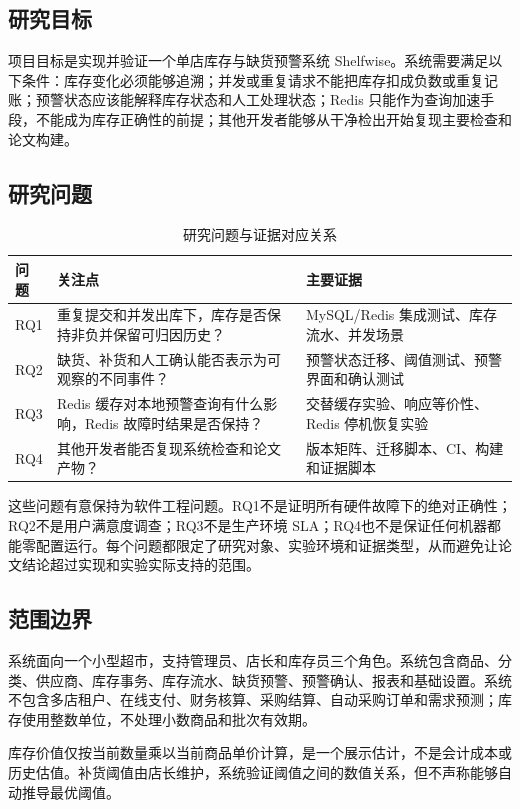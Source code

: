 \documentclass[UTF8,a4paper,11pt]{ctexart}
\begin{document}
\subsection{研究目标}
项目目标是实现并验证一个单店库存与缺货预警系统 Shelfwise。系统需要满足以下条件：库存变化必须能够追溯；并发或重复请求不能把库存扣成负数或重复记账；预警状态应该能解释库存状态和人工处理状态；Redis 只能作为查询加速手段，不能成为库存正确性的前提；其他开发者能够从干净检出开始复现主要检查和论文构建。

\subsection{研究问题}
\begin{table}[H]\centering\small
\caption{研究问题与证据对应关系}
\begin{tabularx}{\textwidth}{p{}YY}\toprule
问题 & 关注点 & 主要证据\\\midrule
RQ1 & 重复提交和并发出库下，库存是否保持非负并保留可归因历史？ & MySQL/Redis 集成测试、库存流水、并发场景\\
RQ2 & 缺货、补货和人工确认能否表示为可观察的不同事件？ & 预警状态迁移、阈值测试、预警界面和确认测试\\
RQ3 & Redis 缓存对本地预警查询有什么影响，Redis 故障时结果是否保持？ & 交替缓存实验、响应等价性、Redis 停机恢复实验\\
RQ4 & 其他开发者能否复现系统检查和论文产物？ & 版本矩阵、迁移脚本、CI、构建和证据脚本\\\bottomrule
\end{tabularx}
\end{table}

这些问题有意保持为软件工程问题。RQ1不是证明所有硬件故障下的绝对正确性；RQ2不是用户满意度调查；RQ3不是生产环境 SLA；RQ4也不是保证任何机器都能零配置运行。每个问题都限定了研究对象、实验环境和证据类型，从而避免让论文结论超过实现和实验实际支持的范围。

\subsection{范围边界}
系统面向一个小型超市，支持管理员、店长和库存员三个角色。系统包含商品、分类、供应商、库存事务、库存流水、缺货预警、预警确认、报表和基础设置。系统不包含多店租户、在线支付、财务核算、采购结算、自动采购订单和需求预测；库存使用整数单位，不处理小数商品和批次有效期。

库存价值仅按当前数量乘以当前商品单价计算，是一个展示估计，不是会计成本或历史估值。补货阈值由店长维护，系统验证阈值之间的数值关系，但不声称能够自动推导最优阈值。
\end{document}
